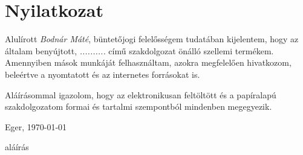 \documentclass{thesis-ekf}
\begin{document}
\chapter*{Nyilatkozat}
\thispagestyle{empty}

Alulírott \emph{Bodnár Máté}, büntetőjogi felelősségem tudatában kijelentem, hogy az általam benyújtott, \emph{..........} című szakdolgozat önálló szellemi termékem. Amennyiben mások munkáját felhasználtam, azokra megfelelően hivatkozom, beleértve a nyomtatott és az internetes forrásokat is.

Aláírásommal igazolom, hogy az elektronikusan feltöltött és a papíralapú szakdolgozatom formai és tartalmi szempontból mindenben megegyezik.

\bigskip
\begin{flushleft}
Eger, \today
\end{flushleft}

\bigskip
\begin{flushright}
aláírás\hspace{3cm}\mbox{}
\end{flushright}

\end{document}
